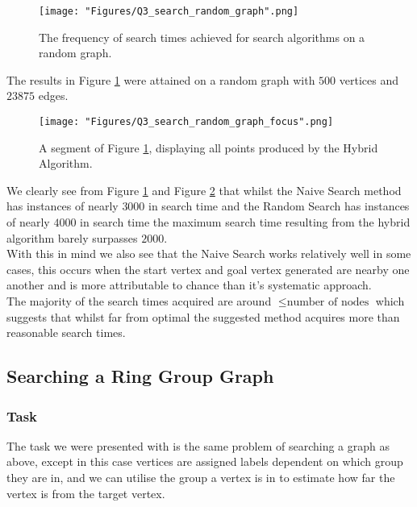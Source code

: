 \documentclass[12pt, a4paper]{article}
\begin{document}
 \begin{figure}[!htb]
     \centering
     \texttt{[image: "Figures/Q3\_search\_random\_graph".png]}
     \caption{The frequency of search times achieved for search algorithms on a random graph.}
     \label{Fig:search_random_graph}
\end{figure}
The results in Figure \ref{Fig:search_random_graph} were attained on a random graph with $500$ vertices and $23875$ edges.\\
\newpage
\begin{figure}[!htb]
     \centering
     \texttt{[image: "Figures/Q3\_search\_random\_graph\_focus".png]}
     \caption{A segment of Figure \ref{Fig:search_random_graph}, displaying all points produced by the Hybrid Algorithm.}
     \label{Fig:search_random_graph_focus}
\end{figure}
We clearly see from Figure \ref{Fig:search_random_graph} and Figure \ref{Fig:search_random_graph_focus} that whilst the Naive Search method has instances of nearly $3000$ in search time and the Random Search has instances of nearly $4000$ in search time the maximum search time resulting from the hybrid algorithm barely surpasses $2000$.\\
With this in mind we also see that the Naive Search works relatively well in some cases, this occurs when the start vertex and goal vertex generated are nearby one another and is more attributable to chance than it's systematic approach.\\
The majority of the search times acquired are around $\leq \text{number of nodes}$ which suggests that whilst far from optimal the suggested method acquires more than reasonable search times.
\newpage
\subsection*{Searching a Ring Group Graph }
\subsubsection*{Task}
The task we were presented with is the same problem of searching a graph as above, except in this case vertices are assigned labels dependent on which group they are in, and we can utilise the group a vertex is in to estimate how far the vertex is from the target vertex.
\end{document}

